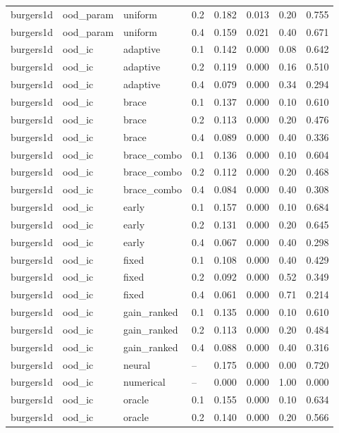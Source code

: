 \begin{longtable}{llllrrrr}
burgers1d & ood\_param & uniform & 0.2 & 0.182 & 0.013 & 0.20 & 0.755 \\
burgers1d & ood\_param & uniform & 0.4 & 0.159 & 0.021 & 0.40 & 0.671 \\
\midrule
burgers1d & ood\_ic & adaptive & 0.1 & 0.142 & 0.000 & 0.08 & 0.642 \\
burgers1d & ood\_ic & adaptive & 0.2 & 0.119 & 0.000 & 0.16 & 0.510 \\
burgers1d & ood\_ic & adaptive & 0.4 & 0.079 & 0.000 & 0.34 & 0.294 \\
burgers1d & ood\_ic & brace & 0.1 & 0.137 & 0.000 & 0.10 & 0.610 \\
burgers1d & ood\_ic & brace & 0.2 & 0.113 & 0.000 & 0.20 & 0.476 \\
burgers1d & ood\_ic & brace & 0.4 & 0.089 & 0.000 & 0.40 & 0.336 \\
burgers1d & ood\_ic & brace\_combo & 0.1 & 0.136 & 0.000 & 0.10 & 0.604 \\
burgers1d & ood\_ic & brace\_combo & 0.2 & 0.112 & 0.000 & 0.20 & 0.468 \\
burgers1d & ood\_ic & brace\_combo & 0.4 & 0.084 & 0.000 & 0.40 & 0.308 \\
burgers1d & ood\_ic & early & 0.1 & 0.157 & 0.000 & 0.10 & 0.684 \\
burgers1d & ood\_ic & early & 0.2 & 0.131 & 0.000 & 0.20 & 0.645 \\
burgers1d & ood\_ic & early & 0.4 & 0.067 & 0.000 & 0.40 & 0.298 \\
burgers1d & ood\_ic & fixed & 0.1 & 0.108 & 0.000 & 0.40 & 0.429 \\
burgers1d & ood\_ic & fixed & 0.2 & 0.092 & 0.000 & 0.52 & 0.349 \\
burgers1d & ood\_ic & fixed & 0.4 & 0.061 & 0.000 & 0.71 & 0.214 \\
burgers1d & ood\_ic & gain\_ranked & 0.1 & 0.135 & 0.000 & 0.10 & 0.610 \\
burgers1d & ood\_ic & gain\_ranked & 0.2 & 0.113 & 0.000 & 0.20 & 0.484 \\
burgers1d & ood\_ic & gain\_ranked & 0.4 & 0.088 & 0.000 & 0.40 & 0.316 \\
burgers1d & ood\_ic & neural & -- & 0.175 & 0.000 & 0.00 & 0.720 \\
burgers1d & ood\_ic & numerical & -- & 0.000 & 0.000 & 1.00 & 0.000 \\
burgers1d & ood\_ic & oracle & 0.1 & 0.155 & 0.000 & 0.10 & 0.634 \\
burgers1d & ood\_ic & oracle & 0.2 & 0.140 & 0.000 & 0.20 & 0.566 \\

\end{longtable}
